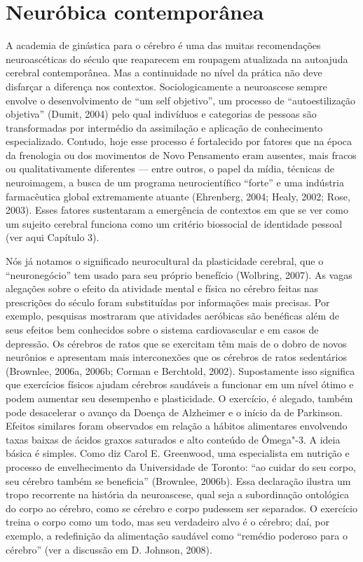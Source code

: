 \chapter{Neuróbica contemporânea}

A academia de ginástica para o cérebro é uma das muitas recomendações
neuroascéticas do século  que reaparecem em roupagem atualizada na
autoajuda cerebral contemporânea. Mas a continuidade no nível da prática
não deve disfarçar a diferença nos contextos. Sociologicamente a
neuroascese sempre envolve o desenvolvimento de ``um self objetivo'', um
processo de ``autoestilização objetiva'' (Dumit, 2004) pelo qual
indivíduos e categorias de pessoas são transformadas por intermédio da
assimilação e aplicação de conhecimento especializado. Contudo, hoje
esse processo é fortalecido por fatores que na época da frenologia ou
dos movimentos de Novo Pensamento eram ausentes, mais fracos ou
qualitativamente diferentes --- entre outros, o papel da mídia, técnicas
de neuroimagem, a busca de um programa neurocientífico ``forte'' e uma
indústria farmacêutica global extremamente atuante (Ehrenberg, 2004;
Healy, 2002; Rose, 2003). Esses fatores sustentaram a emergência de
contextos em que se ver como um sujeito cerebral funciona como um
critério biossocial de identidade pessoal (ver aqui Capítulo 3).

Nós já notamos o significado neurocultural da plasticidade cerebral, que
o ``neuronegócio'' tem usado para seu próprio benefício (Wolbring,
2007). As vagas alegações sobre o efeito da atividade mental e física no
cérebro feitas nas prescrições do século  foram substituídas por
informações mais precisas. Por exemplo, pesquisas mostraram que
atividades aeróbicas são benéficas além de seus efeitos bem conhecidos
sobre o sistema cardiovascular e em casos de depressão. Os cérebros de
ratos que se exercitam têm mais de o dobro de novos neurônios e
apresentam mais interconexões que os cérebros de ratos sedentários
(Brownlee, 2006a, 2006b; Corman e Berchtold, 2002). Supostamente isso
significa que exercícios físicos ajudam cérebros saudáveis a funcionar
em um nível ótimo e podem aumentar seu desempenho e plasticidade. O
exercício, é alegado, também pode desacelerar o avanço da Doença de
Alzheimer e o início da de Parkinson. Efeitos similares foram observados
em relação a hábitos alimentares envolvendo taxas baixas de ácidos
graxos saturados e alto conteúdo de Ômega"-3. A ideia básica é simples.
Como diz Carol E. Greenwood, uma especialista em nutrição e processo de
envelhecimento da Universidade de Toronto: ``ao cuidar do seu corpo, seu
cérebro também se beneficia'' (Brownlee, 2006b). Essa declaração ilustra
um tropo recorrente na história da neuroascese, qual seja a subordinação
ontológica do corpo ao cérebro, como se cérebro e corpo pudessem ser
separados. O exercício treina o corpo como um todo, mas seu verdadeiro
alvo é o cérebro; daí, por exemplo, a redefinição da alimentação
saudável como ``remédio poderoso para o cérebro'' (ver a discussão em D.
Johnson, 2008).

